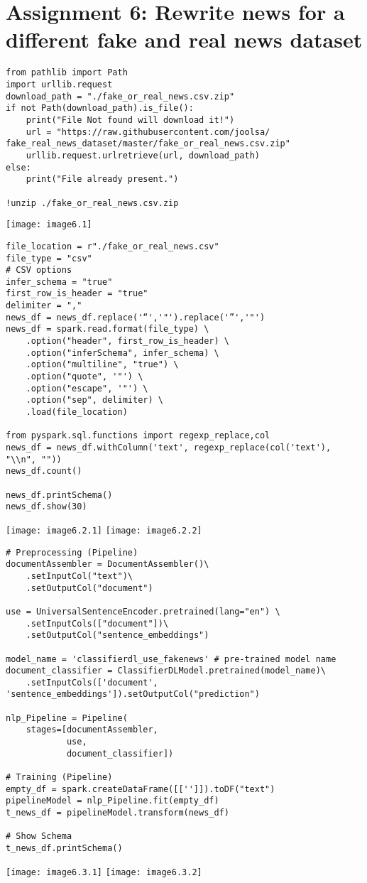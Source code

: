 \documentclass[]{article}
\begin{document}
\clearpage

\section*{Assignment 6: Rewrite news for a different fake and real news dataset}
\begin{verbatim}
from pathlib import Path
import urllib.request
download_path = "./fake_or_real_news.csv.zip"
if not Path(download_path).is_file():
	print("File Not found will download it!")
	url = "https://raw.githubusercontent.com/joolsa/ fake_real_news_dataset/master/fake_or_real_news.csv.zip"
	urllib.request.urlretrieve(url, download_path)
else:
	print("File already present.")

!unzip ./fake_or_real_news.csv.zip
\end{verbatim}
\texttt{[image: image6.1]} 

\clearpage

\begin{verbatim}
file_location = r"./fake_or_real_news.csv"
file_type = "csv"
# CSV options
infer_schema = "true"
first_row_is_header = "true"
delimiter = ","
news_df = news_df.replace('“','"').replace('”','"')
news_df = spark.read.format(file_type) \
	.option("header", first_row_is_header) \
	.option("inferSchema", infer_schema) \
	.option("multiline", "true") \
	.option("quote", '"') \
	.option("escape", '"') \
	.option("sep", delimiter) \
	.load(file_location)

from pyspark.sql.functions import regexp_replace,col
news_df = news_df.withColumn('text', regexp_replace(col('text'), "\\n", ""))
news_df.count()

news_df.printSchema()
news_df.show(30)
\end{verbatim}
\texttt{[image: image6.2.1]}
\texttt{[image: image6.2.2]}


\begin{verbatim}
# Preprocessing (Pipeline)
documentAssembler = DocumentAssembler()\
	.setInputCol("text")\
	.setOutputCol("document")

use = UniversalSentenceEncoder.pretrained(lang="en") \
	.setInputCols(["document"])\
	.setOutputCol("sentence_embeddings")

model_name = 'classifierdl_use_fakenews' # pre-trained model name
document_classifier = ClassifierDLModel.pretrained(model_name)\
	.setInputCols(['document', 
'sentence_embeddings']).setOutputCol("prediction")

nlp_Pipeline = Pipeline(
	stages=[documentAssembler, 
			use,
			document_classifier])

# Training (Pipeline)
empty_df = spark.createDataFrame([['']]).toDF("text")
pipelineModel = nlp_Pipeline.fit(empty_df)
t_news_df = pipelineModel.transform(news_df)

# Show Schema
t_news_df.printSchema()
\end{verbatim}
\texttt{[image: image6.3.1]} 
\texttt{[image: image6.3.2]} 
\end{document}
